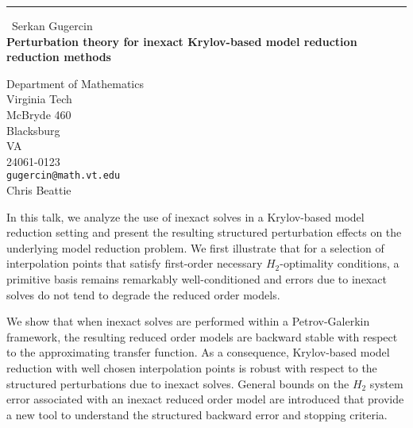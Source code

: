 \documentclass{report}
\begin{document}
\begin{center}
\rule{6in}{1pt} \
{\large Serkan Gugercin \\
{\bf Perturbation theory for inexact Krylov-based model reduction reduction methods}}

Department of Mathematics \\ Virginia Tech \\ McBryde 460 \\ Blacksburg \\ VA \\ 24061-0123
\\
{\tt gugercin@math.vt.edu}\\
Chris Beattie\end{center}

In this talk, we analyze the use of inexact solves in a Krylov-based
model reduction setting and present the resulting structured perturbation
effects on the underlying model reduction problem. We first illustrate
that for a selection of interpolation points that satisfy first-order
necessary $H_{2}$-optimality
conditions, a primitive basis remains remarkably well-conditioned and
errors due to inexact solves do not tend to degrade the reduced order
models.

We show that when inexact solves are performed within a Petrov-Galerkin
framework, the resulting reduced order models are backward stable with
respect to the
approximating transfer function. As a consequence, Krylov-based model
reduction with well chosen interpolation points is robust with respect to
the structured perturbations due to inexact solves. General bounds on the
$H_{2}$ system error associated with an inexact reduced order model are
introduced that provide a new tool to understand the structured backward
error and stopping criteria.
\end{document}
